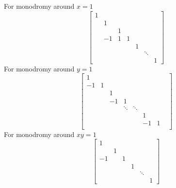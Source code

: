 \documentclass[main]{subfiles}
\begin{document}
For monodromy around $x=1$
\[\begin{bmatrix}
1\\
&1\\
&&1&&&\\
&-1&1&1&&\\
&&&&1&\\
&&&&&\ddots\\
&&&&&&1
\end{bmatrix}\]
For monodromy around $y=1$
\[\begin{bmatrix}
1&&&&&&&\\
-1&1&&&&&&\\
&&1&&&&&\\
&&-1&1&&&&\\
&&&\ddots&\ddots\\
&&&&&1&\\
&&&&&-1&1\\
\end{bmatrix}\]
For monodromy around $xy=1$
\[\begin{bmatrix}
1\\
&1\\
-1&&1\\
&&&1\\
&&&&\ddots\\
&&&&&1
\end{bmatrix}\]
\end{document}
